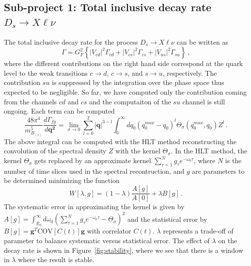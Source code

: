 \documentclass [a4paper, 11pt]{article}
\begin{document}
\subsection{Sub-project 1: Total inclusive decay rate $D_s \to X\ell\nu$}

The total inclusive decay rate for the
process $D_s \to X\ell\nu$ can be written as
\begin{equation}
	\Gamma = G^2_F\left\{ |V_{cd} |^2 \Gamma_{cd} + |V_{cs} |^2 \Gamma_{cs} + |V_{us} |^2 \Gamma_{su}
	\right\}\,,
\end{equation}
where the different contributions on the right hand side correspond at the quark level to the weak
transitions $c \to d$, $c \to s$, and $s \to u$, respectively.
The contribution $su$ is suppressed by the integration over the phase
space thus expected to be negligible. So far, we have computed only
the contribution coming from the channels $cd$ and $cs$ and the
computaiton of the $su$ channel is still ongoing.
Each term can be computed
\begin{equation}
	\frac{48 \pi^4}{m_{B_{(s)}}^5}\frac{d\Gamma_{fg}}{d \bm{ q^2} }
	=\lim_{\sigma\to 0}\sum_{l=0}^2 |\bm{q}|^{3-l}\int_0^{\infty}d q_0 (q^{max}_0-q_0)^l\Theta_\sigma(q_0^{max},q_0) Z^l\,.
	\label{eq:gamma}
\end{equation}
The above integral can be computed with the HLT method \cite{Hansen:2019idp} reconstructing the
convolution of the spectral
density $Z$  with the kernel $\Theta_\sigma$.
In the HLT method, the kernel $\Theta_\sigma$ gets replaced by an
approximate kernel $\sum_{\tau=1}^Ng_\tau e^{-\omega_0\tau}$, where
$N$ is the number of time slices used in the spectral recontruction,
and $g$ are parameters to be determined minimizing the function 
\begin{equation}
  W[\lambda, g]=(1-\lambda)\frac{A[g]}{A[0]}+\lambda B[g]\,.
  \label{eq:W_HLT}
\end{equation}
The systematic error in approximating the kernel is given by
$A[g]=\int_{E_0}^\infty d \omega_0( \sum_{\tau=1}^N g_\tau e^{-\omega_0\tau}- \Theta_\sigma )^2$
and the statistical error by $B[g]=\bm{g}^T
\mbox{COV}[C(t)]\bm{g}$ with correlator $C(t)$. $\lambda$ represents a
trade-off of parameter to balance systematic versus statistical
error. The effect of $\lambda$ on the decay rate is shown in
Figure~\ref{fig:stability}, where we see that there is a window in
$\lambda$ where the result is stable. 
\end{document}
